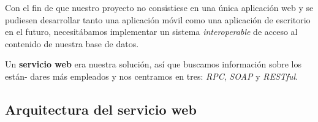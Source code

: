 Con el fin de que nuestro proyecto no consistiese en una única aplicación web y se pudiesen desarrollar tanto una aplicación móvil como una aplicación de escritorio en el futuro, necesitábamos implementar un sistema \textit{interoperable} de acceso al contenido de nuestra base de datos.

\vspace{1em}

Un \textbf{servicio web} era nuestra solución, así que buscamos información sobre los están- dares más empleados y nos centramos en tres: \textit{RPC}, \textit{SOAP} y \textit{RESTful}.

\subsection{Arquitectura del servicio web}

